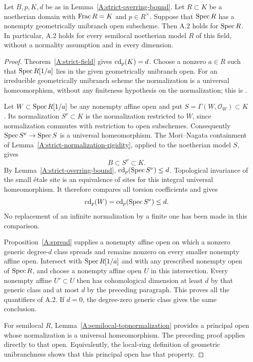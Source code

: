 \begin{theorem}
\label{A:A2-topnormal-models}
Let $B,p,K,d$ be as in Lemma~\ref{A:strict-overring-bound}.
Let $R\subset K$ be a noetherian domain with $\operatorname{Frac} R=K$ and
$p\in R^\times$. Suppose that $\operatorname{Spec} R$ has a nonempty
geometrically unibranch open subscheme. Then A.2 holds for
$\operatorname{Spec} R$. In particular, A.2 holds for every semilocal
noetherian model $R$ of this field, without a normality assumption
and in every dimension.
\end{theorem}
\begin{proof}
Theorem~\ref{A:strict-field} gives $\operatorname{cd}_p(K)=d$.
Choose a nonzero $a\in R$ such that $\operatorname{Spec} R[1/a]$ lies in the
given geometrically unibranch open. For an irreducible
geometrically unibranch scheme the normalization is a universal
homeomorphism, without any finiteness hypothesis on the
normalization; this is
\citet[Tag 0GIQ, Lemma 29.55.12]{A_Stacks}.

Let $W\subset\operatorname{Spec} R[1/a]$ be any nonempty affine open and put
$S=\Gamma(W,\mathcal O_W)\subset K$. Its normalization
$S^\nu\subset K$ is the normalization restricted to $W$, since
normalization commutes with restriction to open subschemes.
Consequently $\operatorname{Spec} S^\nu\to\operatorname{Spec} S$ is a universal
homeomorphism. The Mori--Nagata containment of
Lemma~\ref{A:strict-normalization-rigidity}, applied to the
noetherian model $S$, gives
\[
 B\subset S^\nu\subset K.
\]
By Lemma~\ref{A:strict-overring-bound},
$\operatorname{cd}_p(\operatorname{Spec} S^\nu)\leq d$. Topological invariance of the
small \'etale site
\citep[Tag 04DZ, Theorem 59.45.2]{A_Stacks}
is an equivalence of sites for this integral universal
homeomorphism. It therefore compares all torsion coefficients
and gives
\[
 \operatorname{cd}_p(W)=\operatorname{cd}_p(\operatorname{Spec} S^\nu)\leq d.
\]
No replacement of an infinite normalization by a finite one has
been made in this comparison.

Proposition~\ref{A:spread} supplies a nonempty affine open on
which a nonzero generic degree-$d$ class spreads and remains
nonzero on every smaller nonempty affine open. Intersect with
$\operatorname{Spec} R[1/a]$ and with any prescribed nonempty open of
$\operatorname{Spec} R$, and choose a nonempty affine open $U$ in this
intersection. Every nonempty affine $U'\subset U$ then has
cohomological dimension at least $d$ by that generic class and at
most $d$ by the preceding paragraph. This proves all the
quantifiers of A.2. If $d=0$, the degree-zero generic class gives
the same conclusion.

For semilocal $R$, Lemma~\ref{A:semilocal-topnormalization}
provides a principal open whose normalization is a universal
homeomorphism. The preceding proof applies directly to that
open. Equivalently, the local-ring definition of geometric
unibranchness shows that this principal open has that property.
\end{proof}

